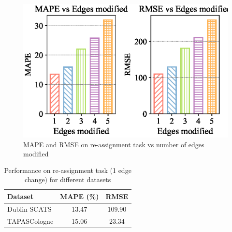 \begin{figure}[t]
  \centering
  \includegraphics[width=\linewidth]{modif.eps}
  \caption{MAPE and RMSE on re-assignment task vs number of edges modified}
  \label{fig:edge_modif}
\end{figure}

\begin{table}[]
\centering
\caption{Performance on re-assignment task (1 edge change) for different datasets}
\label{reassign_table}
\begin{tabular}{lcc}
\toprule
Dataset & MAPE (\%) & RMSE \\
\midrule
Dublin SCATS & 13.47 & 109.90 \\
TAPASCologne & 15.06 & 23.34 \\
\bottomrule
\end{tabular}
\end{table}